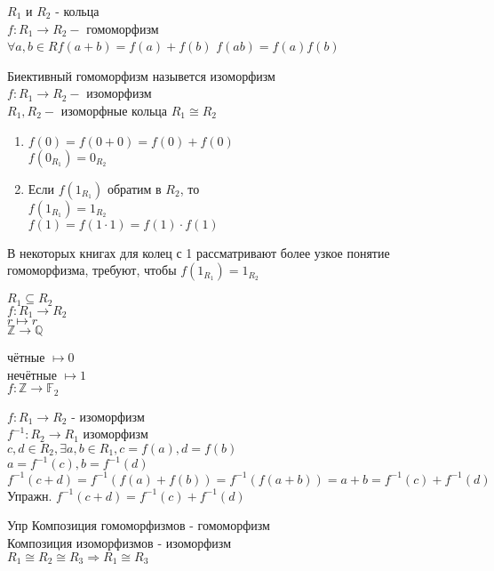 

\begin{definition}
	$ R_1 $ и $R_2 $ - кольца \\
	$ f : R_1 \rightarrow R_2 - $ гомоморфизм \\
	$  \forall a, b \in R f(a+b) = f(a) + f(b) $
	$ f(ab) = f(a)f(b)$
\end{definition}

\begin{definition}
	Биективный гомоморфизм назывется изоморфизм  \\
	$ f : R_1 \rightarrow R_2 - $ изоморфизм \\
	$ R_1, R_2 - $ изоморфные кольца
	$ R_1 \cong R_2$
\end{definition}
\begin{properties}
	\begin{enumerate}
		\item $ f(0) = f(0+0) = f(0) + f(0) $ \\
		$ f(0_{R_1}) = 0_{R_2} $
		\item Если $f(1_{R_1}) $ обратим в $R_2$, то \\
		$ f(1_{R_1}) = 1_{R_2} $ \\
		$ f(1) = f(1 \cdot 1) = f(1) \cdot f(1) $
		
	\end{enumerate}
\end{properties}
В некоторых книгах для колец с 1 рассматривают более узкое понятие гомоморфизма, требуют, чтобы $ f(1_{R_1}) = 1_{R_2} $\\
\begin{example}
	$ R_1 \subseteq R_2 $ \\
	$ f: R_1 \rightarrow R_2 $ \\
	$ r \mapsto r $ \\
	$ \mathbb{Z} \rightarrow \mathbb{Q} $
\end{example}
\begin{example}
	чётные $ \mapsto 0 $ \\
	нечётные $ \mapsto 1 $ \\
	$ f: \mathbb{Z} \rightarrow \mathbb{F}_2 $
\end{example}
\begin{properties}
	$ f: R_1 \rightarrow R_2 $ - изоморфизм \\
	$ f^{-1} : R_2 \rightarrow R_1 $ изоморфизм \\
	$ c, d \in R_2, \exists a,b \in R_1, c = f(a), d = f(b) $ \\
	$ a = f^{-1}(c), b = f^{-1} (d) $ \\
	$ f^{-1} (c+d) = f^{-1} (f(a) + f(b)) = f^{-1} (f(a+b)) = a+b = f^{-1} (c) + f^{-1} (d) $\\
	Упражн. $ f^{-1} (c+d) = f^{-1}(c) + f^{-1}(d) $ 
\end{properties}
Упр Композиция гомоморфизмов - гомоморфизм\\
Композиция изоморфизмов - изоморфизм\\
$ R_1 \cong R_2 \cong R_3 \Rightarrow R_1 \cong R_3 $

